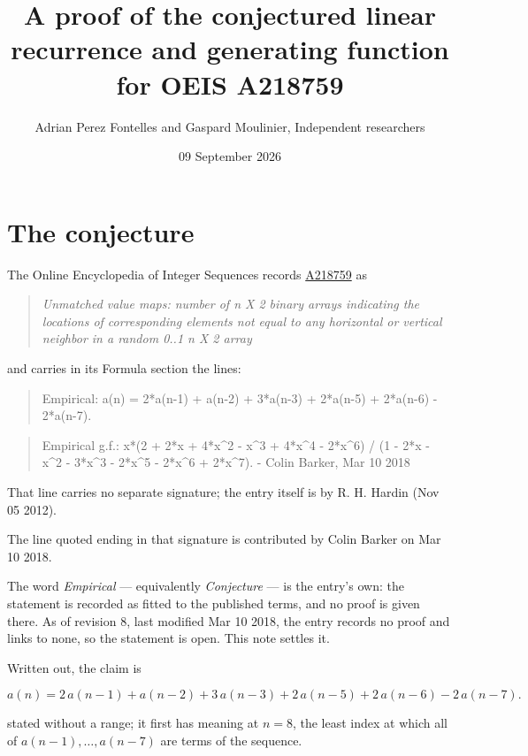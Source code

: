 \documentclass[11pt]{article}
\title{A proof of the conjectured linear recurrence and generating function for OEIS A218759}
\author{Adrian Perez Fontelles and Gaspard Moulinier, Independent researchers}
\date{09 September 2026}
\theoremstyle{definition}
\begin{document}
\maketitle
\section{The conjecture}

The Online Encyclopedia of Integer Sequences records \href{https://oeis.org/A218759}{A218759} as

\begin{quote}\itshape Unmatched value maps: number of n X 2 binary arrays indicating the locations of corresponding elements not equal to any horizontal or vertical neighbor in a random 0..1 n X 2 array\end{quote}

and carries in its Formula section the lines:

\begin{quote}\ttfamily Empirical: a(n) = 2*a(n-1) + a(n-2) + 3*a(n-3) + 2*a(n-5) + 2*a(n-6) - 2*a(n-7).\end{quote}

\begin{quote}\ttfamily Empirical g.f.: x*(2 + 2*x + 4*x\textasciicircum{}2 - x\textasciicircum{}3 + 4*x\textasciicircum{}4 - 2*x\textasciicircum{}6) / (1 - 2*x - x\textasciicircum{}2 - 3*x\textasciicircum{}3 - 2*x\textasciicircum{}5 - 2*x\textasciicircum{}6 + 2*x\textasciicircum{}7). - Colin Barker, Mar 10 2018\end{quote}

That line carries no separate signature; the entry itself is by R. H. Hardin (Nov 05 2012).

The line quoted ending in that signature is contributed by Colin Barker on Mar 10 2018.

The word {\itshape Empirical} --- equivalently {\itshape Conjecture} --- is the entry's own: the statement is recorded as fitted to the published terms, and no proof is given there. As of revision 8, last modified Mar 10 2018, the entry records no proof and links to none, so the statement is open. This note settles it.

Written out, the claim is

\[a(n) = 2\,a(n-1) + a(n-2) + 3\,a(n-3) + 2\,a(n-5) + 2\,a(n-6) - 2\,a(n-7).\]

stated without a range; it first has meaning at $n = 8$, the least index at which all of $a(n-1),\dots,a(n-7)$ are terms of the sequence.
\end{document}
